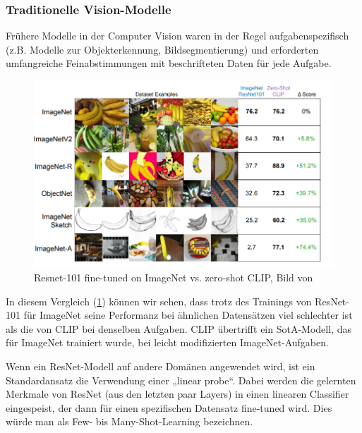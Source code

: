 \documentclass[nolibertine, ngerman, algorithm, nomencl, minted]{ttlab-qualify}
\begin{document}
\subsubsection{Traditionelle Vision-Modelle}
Frühere Modelle in der Computer Vision waren in der Regel aufgabenspezifisch (z.B. Modelle zur Objekterkennung, Bildsegmentierung) und erforderten umfangreiche Feinabstimmungen mit beschrifteten Daten für jede Aufgabe.
\begin{figure}[h]
	\centering
	\includegraphics[scale=0.5]{static/resnet_vs_clip.png}
	\caption{Resnet-101 fine-tuned on ImageNet vs. zero-shot CLIP, Bild von \textcite[15]{radford2021learning}}
	\label{fig:2.7}
\end{figure}

In diesem Vergleich (\ref{fig:2.7}) können wir sehen, dass trotz des Trainings von ResNet-101 für ImageNet seine Performanz bei 
ähnlichen Datensätzen viel schlechter ist als die von CLIP bei denselben Aufgaben. CLIP übertrifft ein SotA-Modell, 
das für ImageNet trainiert wurde, bei leicht modifizierten ImageNet-Aufgaben.

Wenn ein ResNet-Modell auf andere Domänen angewendet wird, ist ein Standardansatz die Verwendung einer „linear probe“. 
Dabei werden die gelernten Merkmale von ResNet (aus den letzten paar Layers) in einen linearen Classifier eingespeist, 
der dann für einen spezifischen Datensatz fine-tuned wird. Dies würde man als Few- bis Many-Shot-Learning bezeichnen.
\end{document}
